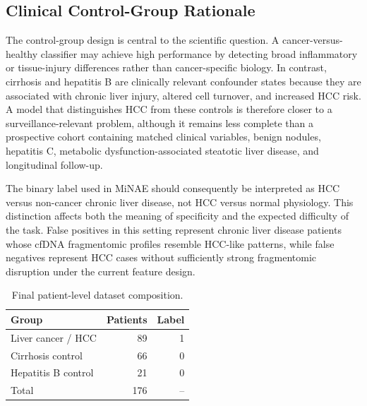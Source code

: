 \documentclass[conference]{IEEEtran}
\begin{document}
\subsection{Clinical Control-Group Rationale}
The control-group design is central to the scientific question. A cancer-versus-healthy classifier may achieve high performance by detecting broad inflammatory or tissue-injury differences rather than cancer-specific biology. In contrast, cirrhosis and hepatitis B are clinically relevant confounder states because they are associated with chronic liver injury, altered cell turnover, and increased HCC risk. A model that distinguishes HCC from these controls is therefore closer to a surveillance-relevant problem, although it remains less complete than a prospective cohort containing matched clinical variables, benign nodules, hepatitis C, metabolic dysfunction-associated steatotic liver disease, and longitudinal follow-up.

The binary label used in MiNAE should consequently be interpreted as HCC versus non-cancer chronic liver disease, not HCC versus normal physiology. This distinction affects both the meaning of specificity and the expected difficulty of the task. False positives in this setting represent chronic liver disease patients whose cfDNA fragmentomic profiles resemble HCC-like patterns, while false negatives represent HCC cases without sufficiently strong fragmentomic disruption under the current feature design.

\begin{table}[t]
\centering
\caption{Final patient-level dataset composition.}
\label{tab:dataset}
\begin{tabular}{lrr}
\toprule
Group & Patients & Label \\
\midrule
Liver cancer / HCC & 89 & 1 \\
Cirrhosis control & 66 & 0 \\
Hepatitis B control & 21 & 0 \\
\midrule
Total & 176 & -- \\
\bottomrule
\end{tabular}
\end{table}
\end{document}
